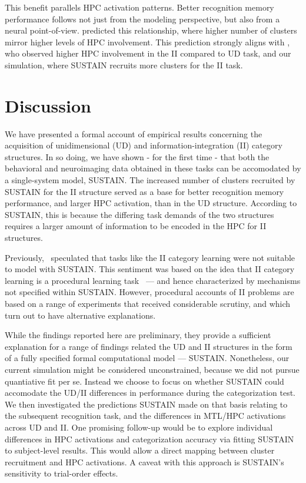 \documentclass[10pt,letterpaper]{article}
\begin{document}
This benefit parallels HPC activation patterns.
Better recognition memory performance follows not just from the modeling
perspective, but also from a neural point-of-view.
 predicted this relationship, where higher number of
clusters mirror higher levels of HPC involvement. This prediction strongly
aligns with , who observed higher HPC involvement in the
II compared to UD task, and our simulation, where SUSTAIN recruits more
clusters for the II task.

\section{Discussion}

We have presented a formal account of empirical results
\cite{3edmunds2016a, Carpenter2016}
concerning the acquisition of unidimensional (UD) and information-integration
(II) category structures. In so doing, we have shown - for the first time -
that both the behavioral and neuroimaging data obtained in these tasks can be
accomodated by a single-system model, SUSTAIN. The increased number of clusters
recruited by SUSTAIN for the II structure served as a base for better
recognition memory performance, and larger HPC activation, than in the UD
structure. According to SUSTAIN, this is because the differing task demands of
the two structures requires a larger amount of information to be encoded in
the HPC for II structures.

Previously,~ speculated that tasks like the II category learning
were not suitable to model with SUSTAIN. This sentiment was based on the
idea that II category learning is a procedural learning task~\cite{Nomura2007}
--- and hence characterized by mechanisms not specified within SUSTAIN.
However, procedural accounts of II problems are based on a range of experiments
that received considerable scrutiny, and which turn out to have alternative
explanations.

While the findings reported here are preliminary,
they provide a sufficient explanation for a range of findings
related the UD and II structures in the form of a fully specified formal
computational model --- SUSTAIN. Nonetheless, our current simulation might
be considered unconstrained, because
we did not pursue quantiative fit per se. Instead we choose to focus
on whether SUSTAIN could accomodate the UD/II differences in performance during
the categorization test. We then investigated the predictions SUSTAIN made on that
basis relating to the subsequent recognition task, and the differences in MTL/HPC
activations across UD and II. One promising follow-up would be to
explore individual differences in HPC activations and categorization
accuracy via fitting SUSTAIN to subject-level results. This would allow
a direct mapping between cluster recruitment and HPC activations. A caveat with
this approach is SUSTAIN's sensitivity to trial-order effects.
\end{document}

